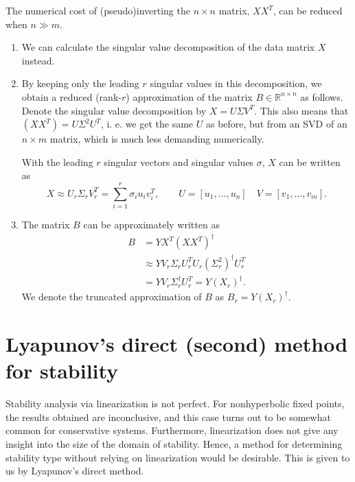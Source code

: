 \begin{remark}[]
The numerical cost of (pseudo)inverting the $n \times n$ matrix, $XX^T$, can be reduced when $n\gg m$.
\begin{enumerate}
\item We can calculate the singular value decomposition of the data matrix $X$ instead. 
\item By keeping only the leading $r$ singular values in this decomposition, we obtain a reduced (rank-$r$) approximation of the matrix $B\in \mathbb{R}^{n \times n}$ as follows. Denote the singular value decomposition by $X = U\Sigma V^T$.  This also means that $(XX^T) = U\Sigma^2 U^T$, i. e. we get the same $U$ as before, but from an SVD of an $n\times m$ matrix, which is much less demanding numerically.

 With the leading $r$ singular vectors and singular values $\sigma$, $X$ can be written as
\begin{equation}
X \approx U_r \Sigma_r V_r^T = \sum_{i=1}^r \sigma_i u_i v_i^T, \qquad U = [u_1, ..., u_n]\quad V = [v_1, ..., v_m].
\end{equation}
\item The matrix $B$ can be approximately written as 
	\begin{subequations}
\begin{align}
B &= YX^T(XX^T)^\dagger \\
& \approx YV_r\Sigma_rU_r^TU_r(\Sigma_r^2)^\dagger U_r^T \\
&= YV_r\Sigma_r^\dagger U_r^T = Y(X_r)^\dagger.
\end{align}\end{subequations}
We denote the truncated approximation of $B$ as $B_r = Y (X_r)^\dagger.$
\end{enumerate}
\end{remark}
	
	
\section{Lyapunov's direct (second) method for stability}
Stability analysis via linearization is not perfect. For nonhyperbolic fixed points, the results obtained are inconclusive, and this case turns out to be somewhat common for conservative systems. Furthermore, linearization does not give any insight into the size of the domain of stability. Hence, a method for determining stability type without relying on linearization would be desirable. This is given to us by Lyapunov's direct method.

